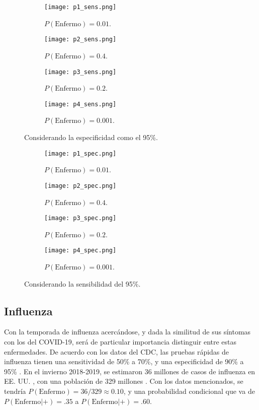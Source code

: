 \documentclass[12pt,letterpaper]{article}
\begin{document}
\begin{figure}
 	\centering 
 	\begin{subfigure}[b]{0.45\linewidth}
 		\texttt{[image: p1\_sens.png]} 		
 		\caption{$P(\text{Enfermo})=0.01$.}
 		 		\label{cuadratica}
 	\end{subfigure}
 	\begin{subfigure}[b]{0.45\linewidth}
 		\texttt{[image: p2\_sens.png]} 		
 		\caption{$P(\text{Enfermo})=0.4$.}
 	\end{subfigure}
 	\begin{subfigure}[b]{0.45\linewidth}
 		\texttt{[image: p3\_sens.png]} 		
 		\caption{$P(\text{Enfermo})=0.2$.}
 	\end{subfigure}
 	\begin{subfigure}[b]{0.45\linewidth}
 		\texttt{[image: p4\_sens.png]} 		
 		\caption{$P(\text{Enfermo})=0.001$.}
 	\end{subfigure}
 	 	\caption{Considerando la especificidad como el 95\%.}
 	 		\label{especificidad}
\end{figure}

\begin{figure}
 	\centering 
 	\begin{subfigure}[b]{0.45\linewidth}
 		\texttt{[image: p1\_spec.png]} 		
 		\caption{$P(\text{Enfermo})=0.01$.}
 	\end{subfigure}
 	\begin{subfigure}[b]{0.45\linewidth}
 		\texttt{[image: p2\_spec.png]} 		
 		\caption{$P(\text{Enfermo})=0.4$.}
 	\end{subfigure}
 	\begin{subfigure}[b]{0.45\linewidth}
 		\texttt{[image: p3\_spec.png]} 		
 		\caption{$P(\text{Enfermo})=0.2$.}
 	\end{subfigure}
 	\begin{subfigure}[b]{0.45\linewidth}
 		\texttt{[image: p4\_spec.png]} 		
 		\caption{$P(\text{Enfermo})=0.001$.}
 	\end{subfigure}
 	 	\caption{Considerando la sensibilidad del 95\%.} 
 	 		\label{sensibilidad}
\end{figure}

\subsection{Influenza}
Con la temporada de influenza acercándose, y dada la similitud de sus síntomas con los del COVID-19, será de particular importancia distinguir entre estas enfermedades. De acuerdo con los datos del CDC, las pruebas rápidas de influenza tienen una sensitividad de 50\% a 70\%, y una especificidad de 90\% a 95\% \cite{flu_ridt_cdc}. En el invierno 2018-2019, se estimaron 36 millones de casos de influenza en EE. UU.  \cite{flu_burden_cdc}, con una población de 329 millones \cite{us_pop_clock}. Con los datos mencionados, se tendría $P(\text{Enfermo}) = 36/329 \approx 0.10$, y una probabilidad condicional que va de $P(\text{Enfermo}|+) = .35$ a $P(\text{Enfermo}|+) = .60$.

 

\end{document}
